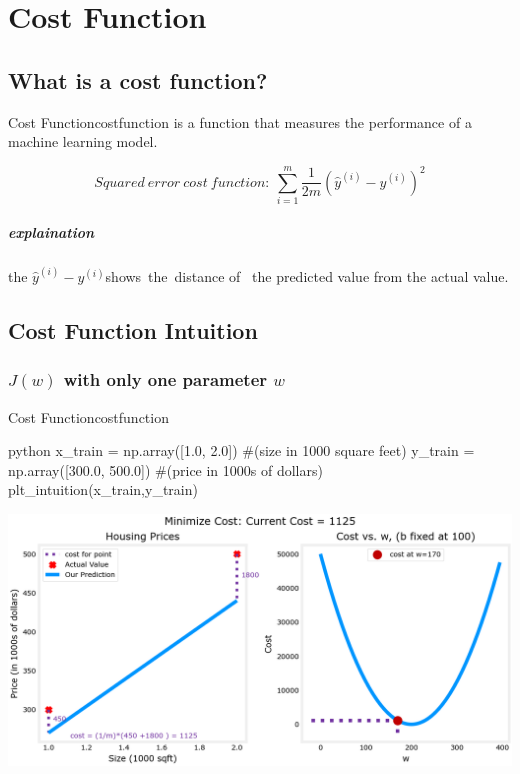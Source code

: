 \chapter{Cost Function}
\section{What is a cost function?}

\begin{dfnbox}{Cost Function}{costfunction}
     is a function that measures the %
    performance of a machine learning model.\par 
    \begin{equation}
        Squared\ error\ cost\ function:\ \sum_{i=1}^{m}\frac{1}{2m}\left(\hat{y}^{(i)}-y^{(i)}\right)^2
    \end{equation} 
\end{dfnbox}

\paragraph*{explaination}
the $\hat{y}^{(i)} - y^{(i)}$shows\ the\ distance of\ %
the predicted value from the actual value.

\section{Cost Function Intuition}
\subsection*{$J(w)$ with only one parameter $w$}
\begin{codebox}{Cost Function}{costfunction}
    \begin{amzcode}{python}
        x_train = np.array([1.0, 2.0])          #(size in 1000 square feet)
        y_train = np.array([300.0, 500.0])      #(price in 1000s of dollars)
        plt_intuition(x_train,y_train)    
    \end{amzcode}
\end{codebox}
\noindent
\includegraphics[width=\textwidth]{images/2.2_1}

